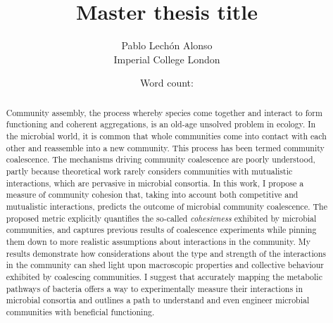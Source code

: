 \documentclass[titlepage,11pt]{article}
\newcommand{\wordcount}{} %
\begin{document}
	
	\title{\textbf{Master thesis title} }
	\author{Pablo Lechón Alonso \\ [30pt]
		Imperial College London}
	\date{Word count: \wordcount}%
	\maketitle
	
	
	\begin{abstract}
		Community assembly, the process whereby species come together and interact to form functioning and coherent aggregations, is an old-age unsolved problem in ecology. In the microbial world, it is common that whole communities come into contact with each other and reassemble into a new community. This process has been termed community coalescence. The mechanisms driving community coalescence are poorly understood, partly because theoretical work rarely considers communities with mutualistic interactions, which are pervasive in microbial consortia. In this work, I propose a measure of community cohesion that, taking into account both competitive and mutualistic interactions, predicts the outcome of microbial community coalescence. The proposed metric explicitly quantifies the so-called \textit{cohesivness} exhibited by microbial communities, and captures previous results of coalescence experiments while pinning them down to more realistic assumptions about interactions in the community. My results demonstrate how considerations about the type and strength of the interactions in the community can shed light upon macroscopic properties and collective behaviour exhibited by coalescing communities.
		I suggest that accurately mapping the metabolic pathways of bacteria offers a way to experimentally measure their interactions in microbial consortia and outlines a path to understand and even engineer microbial communities with beneficial functioning.
	\end{abstract}
	
	\tableofcontents
	\newpage
	
\end{document}
